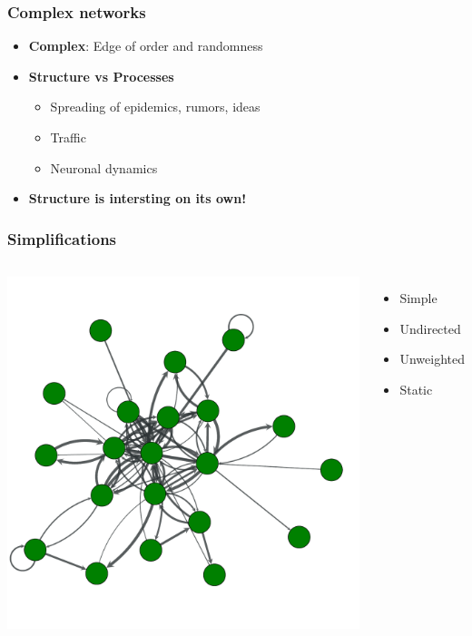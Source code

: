 \documentclass{beamer}
\begin{document}
\begin{frame}
    \frametitle{Complex networks}
    \begin{itemize}
        \pause
    \setlength\itemsep{2em}
       \item{\Large {\bf Complex}: Edge of order and randomness}
        \pause
        \item{\Large {\bf Structure vs Processes}
            \begin{itemize}
            \setlength\itemsep{1em}
                \item{Spreading of epidemics, rumors, ideas}
                \item{Traffic}
                \item{Neuronal dynamics}
            \end{itemize}
        }
        \pause
        \item{\Large \bf Structure is intersting on its own!}
    \end{itemize}
\end{frame}
\begin{frame}
    \frametitle{Simplifications}
    \begin{columns}
            \centering
            \includegraphics[width=0.9\columnwidth]{weighted_directed_nonsimple2.pdf}
            \centering
            \begin{itemize}
            \setlength\itemsep{1em}
                \item{Simple}
                \item{Undirected}
                \item{Unweighted}
                \item{Static}
            \end{itemize}
    \end{columns}
\end{frame}
\end{document}
